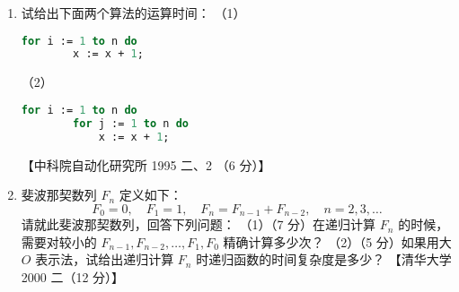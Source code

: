 \documentclass[lang=cn,newtx,10pt,scheme=chinese]{elegantbook}
\begin{document}
\begin{enumerate}
    \item 试给出下面两个算法的运算时间：  
    （1）  
    \begin{lstlisting}[language=Pascal]
    for i := 1 to n do
        x := x + 1;
    \end{lstlisting}
    （2）  
    \begin{lstlisting}[language=Pascal]
    for i := 1 to n do
        for j := 1 to n do
            x := x + 1;
    \end{lstlisting}
    【中科院自动化研究所 1995 二、2 （6 分）】

    \item 斐波那契数列 $F_n$ 定义如下：  
    \[
    F_0 = 0, \quad F_1 = 1, \quad F_n = F_{n-1} + F_{n-2}, \quad n = 2, 3, \dots
    \]
    请就此斐波那契数列，回答下列问题：  
    （1）（7 分）在递归计算 $F_n$ 的时候，需要对较小的 $F_{n-1}, F_{n-2}, \dots, F_1, F_0$ 精确计算多少次？  
    （2）（5 分）如果用大 $O$ 表示法，试给出递归计算 $F_n$ 时递归函数的时间复杂度是多少？  
    【清华大学 2000 二（12 分）】
\end{enumerate}
\end{document}

